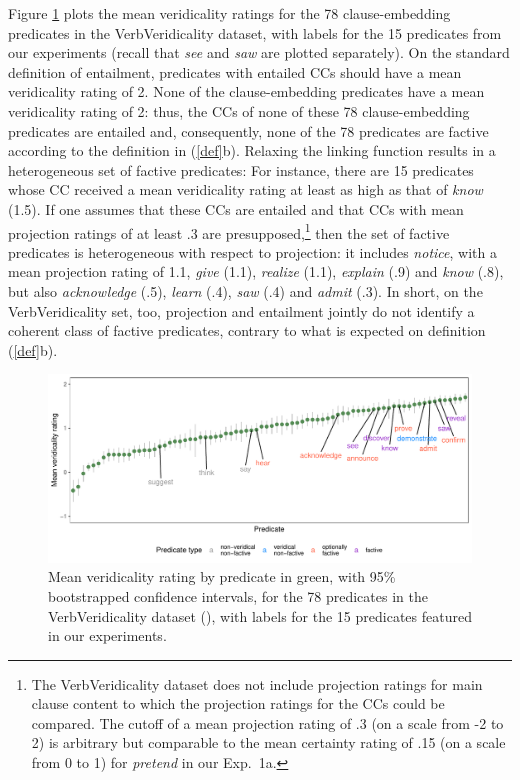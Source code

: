 \documentclass[11pt,fleqn]{article}
\newcommand{\6}{\mbox{$[\hspace*{-.6mm}[$}}
\newcommand{\9}{\mbox{$]\hspace*{-.6mm}]$}}
\begin{document}
Figure \ref{f-vv-projectivity} plots the mean veridicality ratings for the 78 clause-embedding predicates in the VerbVeridicality dataset, with labels for the 15 predicates from our experiments (recall that {\em see} and {\em saw} are plotted separately). On the standard definition of entailment, predicates with entailed CCs should have a mean veridicality rating of 2. None of the clause-embedding predicates have a mean veridicality rating of 2: thus, the CCs of none of these 78 clause-embedding predicates are entailed and, consequently, none of the 78 predicates are factive according to the definition in (\ref{def}b). Relaxing the linking function results in a heterogeneous set of factive predicates: For instance, there are 15 predicates whose CC received a mean veridicality rating at least as high as that of {\em know} (1.5). If one assumes that these CCs are entailed and that CCs with mean projection ratings of at least .3 are presupposed,\footnote{The VerbVeridicality dataset does not include projection ratings for main clause content to which the projection ratings for the CCs could be compared. The cutoff of a mean projection rating of .3 (on a scale from -2 to 2) is arbitrary but comparable to the mean certainty rating of .15 (on a scale from 0 to 1) for {\em pretend} in our Exp.~1a.} then the set of factive predicates is heterogeneous with respect to projection: it includes {\em notice}, with a mean projection rating of 1.1, {\em give} (1.1), {\em realize} (1.1), {\em explain} (.9) and {\em know} (.8), but also {\em acknowledge} (.5), {\em learn} (.4), {\em saw} (.4) and {\em admit} (.3). In short, on the VerbVeridicality set, too, projection and entailment jointly do not identify a coherent class of factive predicates, contrary to what is expected on definition (\ref{def}b).

\begin{figure}[H]
\centering
\includegraphics[width=.77\paperwidth]{../../VerbVeridicality-analysis/graphs/means-entailment-by-predicate}

\caption{Mean veridicality rating by predicate in green, with 95\% bootstrapped confidence intervals, for the 78 predicates in the VerbVeridicality dataset (\citealt{ross-pavlick2019}), with labels for the 15 predicates featured in our experiments.}
\label{f-vv-projectivity}
\end{figure}
\end{document}
